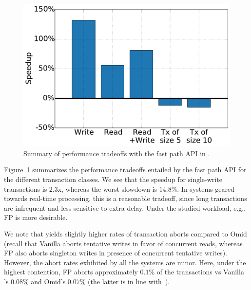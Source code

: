 \begin{figure}[h!]
\centering
\includegraphics[width=.4\textwidth]{figs/speedup.pdf}
\caption{Summary of performance tradeoffs with the fast path API in {\sys}.}
\label{fig:fp-tradeoff}
\end{figure}

Figure~\ref{fig:fp-tradeoff} summarizes the performance tradeoffs entailed by the fast path API
for the different transaction classes. 
We see that the speedup for single-write transactions is 2.3x, whereas the worst slowdown is $14.8\%$. 
In systems geared towards real-time processing, this is a reasonable tradeoff, since long transactions 
are infrequent and less sensitive to extra delay. Under the studied workload, e.g.,   FP \sys\/ is more desirable. 

We note that \sys\/ yields slightly higher rates of transaction aborts compared to Omid (recall 
that Vanilla \sys\/ aborts tentative writes in favor of concurrent reads, whereas FP \sys\/ also aborts
singleton writes in presence of concurrent tentative writes). However, the abort rates exhibited by all  
the systems are minor. Here, under the highest contention, FP \sys\/ aborts approximately $0.1\%$ 
of the transactions vs Vanilla \sys's $0.08\%$ and Omid's $0.07\%$ (the latter  is in line 
with~\cite{Omid2017}).  
